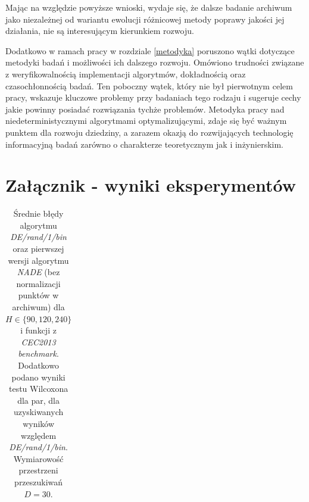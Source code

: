 \documentclass[12pt,a4paper]{report}
\begin{document}
{{{{{{{}
\par{
Mając na względzie powyższe wnioski, wydaje się, że dalsze badanie archiwum jako niezależnej od wariantu ewolucji różnicowej metody poprawy jakości jej działania, nie są interesującym kierunkiem rozwoju.
}
\par{
Dodatkowo w ramach pracy w rozdziale \ref{metodyka} poruszono wątki dotyczące metodyki badań i możliwości ich dalszego rozwoju. Omówiono trudności związane z weryfikowalnością implementacji algorytmów, dokładnością oraz czasochłonnością badań. Ten poboczny wątek, który nie był pierwotnym celem pracy, wskazuje kluczowe problemy przy badaniach tego rodzaju i sugeruje cechy jakie powinny posiadać rozwiązania tychże problemów. Metodyka pracy nad niedeterministycznymi algorytmami optymalizującymi, zdaje się być ważnym punktem dla rozwoju dziedziny, a zarazem okazją do rozwijających technologię informacyjną badań zarówno o charakterze teoretycznym jak i inżynierskim.
}

\chapter{Załącznik - wyniki eksperymentów}
\label{ResultsAttachments}
\begin{table}[]
\centering
\caption{
Średnie błędy algorytmu \emph{DE/rand/1/bin} oraz pierwszej wersji algorytmu \emph{NADE} (bez normalizacji punktów w archiwum) dla $H \in \{90, 120, 240\}$ i funkcji z \emph{CEC2013 benchmark}. Dodatkowo podano wyniki testu Wilcoxona dla par, dla uzyskiwanych wyników względem \emph{DE/rand/1/bin}. Wymiarowość przestrzeni przeszukiwań $D = 30$.
}
\par{\vphantom{10}}
\par{ }
\label{Eksp1}
\begin{tabular}{|l|l|l|l|l|}


\end{tabular}
\end{table}}}}}}}
\end{document}
